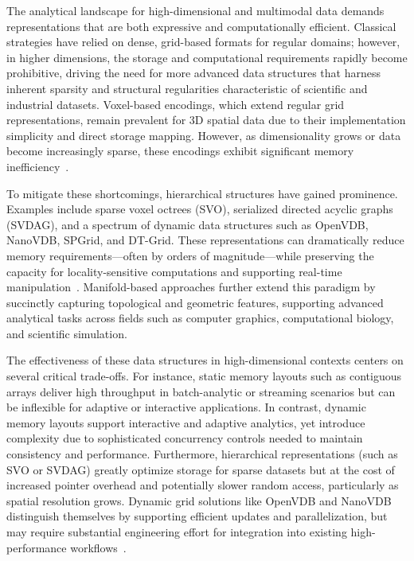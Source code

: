 \documentclass[sigconf]{acmart}
\begin{document}
The analytical landscape for high-dimensional and multimodal data demands representations that are both expressive and computationally efficient. Classical strategies have relied on dense, grid-based formats for regular domains; however, in higher dimensions, the storage and computational requirements rapidly become prohibitive, driving the need for more advanced data structures that harness inherent sparsity and structural regularities characteristic of scientific and industrial datasets. Voxel-based encodings, which extend regular grid representations, remain prevalent for 3D spatial data due to their implementation simplicity and direct storage mapping. However, as dimensionality grows or data become increasingly sparse, these encodings exhibit significant memory inefficiency~\cite{ref86}.

To mitigate these shortcomings, hierarchical structures have gained prominence. Examples include sparse voxel octrees (SVO), serialized directed acyclic graphs (SVDAG), and a spectrum of dynamic data structures such as OpenVDB, NanoVDB, SPGrid, and DT-Grid. These representations can dramatically reduce memory requirements---often by orders of magnitude---while preserving the capacity for locality-sensitive computations and supporting real-time manipulation~\cite{ref86}. Manifold-based approaches further extend this paradigm by succinctly capturing topological and geometric features, supporting advanced analytical tasks across fields such as computer graphics, computational biology, and scientific simulation.

The effectiveness of these data structures in high-dimensional contexts centers on several critical trade-offs. For instance, static memory layouts such as contiguous arrays deliver high throughput in batch-analytic or streaming scenarios but can be inflexible for adaptive or interactive applications. In contrast, dynamic memory layouts support interactive and adaptive analytics, yet introduce complexity due to sophisticated concurrency controls needed to maintain consistency and performance. Furthermore, hierarchical representations (such as SVO or SVDAG) greatly optimize storage for sparse datasets but at the cost of increased pointer overhead and potentially slower random access, particularly as spatial resolution grows. Dynamic grid solutions like OpenVDB and NanoVDB distinguish themselves by supporting efficient updates and parallelization, but may require substantial engineering effort for integration into existing high-performance workflows~\cite{ref86}. 
\end{document}
